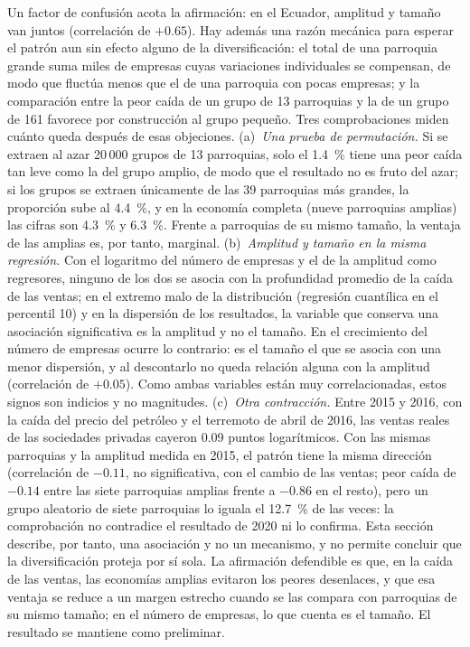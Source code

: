 \documentclass[12pt,a4paper]{article}
\begin{document}
Un factor de confusión acota la afirmación: en el Ecuador, amplitud y tamaño van juntos (correlación de $+0.65$). Hay además una razón mecánica para esperar el patrón aun sin efecto alguno de la diversificación: el total de una parroquia grande suma miles de empresas cuyas variaciones individuales se compensan, de modo que fluctúa menos que el de una parroquia con pocas empresas; y la comparación entre la peor caída de un grupo de 13 parroquias y la de un grupo de 161 favorece por construcción al grupo pequeño. Tres comprobaciones miden cuánto queda después de esas objeciones. (a)~\textit{Una prueba de permutación.} Si se extraen al azar 20\,000 grupos de 13 parroquias, solo el 1.4~\% tiene una peor caída tan leve como la del grupo amplio, de modo que el resultado no es fruto del azar; si los grupos se extraen únicamente de las 39 parroquias más grandes, la proporción sube al 4.4~\%, y en la economía completa (nueve parroquias amplias) las cifras son 4.3~\% y 6.3~\%. Frente a parroquias de su mismo tamaño, la ventaja de las amplias es, por tanto, marginal. (b)~\textit{Amplitud y tamaño en la misma regresión.} Con el logaritmo del número de empresas y el de la amplitud como regresores, ninguno de los dos se asocia con la profundidad promedio de la caída de las ventas; en el extremo malo de la distribución (regresión cuantílica en el percentil 10) y en la dispersión de los resultados, la variable que conserva una asociación significativa es la amplitud y no el tamaño. En el crecimiento del número de empresas ocurre lo contrario: es el tamaño el que se asocia con una menor dispersión, y al descontarlo no queda relación alguna con la amplitud (correlación de $+0.05$). Como ambas variables están muy correlacionadas, estos signos son indicios y no magnitudes. (c)~\textit{Otra contracción.} Entre 2015 y 2016, con la caída del precio del petróleo y el terremoto de abril de 2016, las ventas reales de las sociedades privadas cayeron 0.09 puntos logarítmicos. Con las mismas parroquias y la amplitud medida en 2015, el patrón tiene la misma dirección (correlación de $-0.11$, no significativa, con el cambio de las ventas; peor caída de $-0.14$ entre las siete parroquias amplias frente a $-0.86$ en el resto), pero un grupo aleatorio de siete parroquias lo iguala el 12.7~\% de las veces: la comprobación no contradice el resultado de 2020 ni lo confirma. Esta sección describe, por tanto, una asociación y no un mecanismo, y no permite concluir que la diversificación proteja por sí sola. La afirmación defendible es que, en la caída de las ventas, las economías amplias evitaron los peores desenlaces, y que esa ventaja se reduce a un margen estrecho cuando se las compara con parroquias de su mismo tamaño; en el número de empresas, lo que cuenta es el tamaño. El resultado se mantiene como preliminar.
\par
\endgroup
\end{document}
